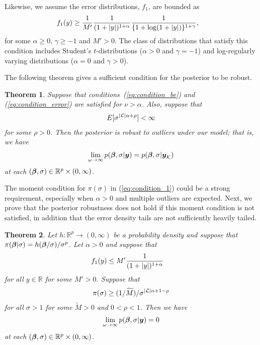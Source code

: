 \documentclass[12pt]{article}
\newtheorem{thm}{Theorem}
\def\si{{\sigma}}
\def\al{{\alpha}}
\def\ga{{\gamma}}
\def\si{{\sigma}}
\def\om{{\omega}}
\def\non{{\nonumber}}
\def\Lc{{\cal L}}
\def\Kc{{\cal K}}
\def\Mt{{\widetilde M}}
\def\al{{\alpha}}
\def\ga{{\gamma}}
\def\si{{\sigma}}
\def\om{{\omega}}
\def\bbe{{\text{\boldmath $\beta$}}}
\def\y{{\text{\boldmath $y$}}}
\def\Lc{{\cal L}}
\def\Kc{{\cal K}}
\def\non{{\nonumber}}
\begin{document}
Likewise, we assume the error distributions, $f_1$, are bounded as 
\begin{align}
f_1 (y) &\ge {1 \over M'} {1 \over (1 + |y|)^{1 + \al }} {1 \over \{ 1 + \log (1 + |y|) \} ^{1 + \ga }} ,\label{eq:condition_error} 
\end{align}
%
for some $\al \ge 0$, $\ga \ge - 1$ and $M' > 0$. 
The class of distributions that satisfy this condition includes Student's $t$-distributions ($\al > 0$ and $\ga = - 1$) and  log-regularly varying distributions ($\al = 0$ and $\ga > 0$). 

The following theorem gives a sufficient condition for the posterior to be robust. 

\begin{thm}
\label{thm:condition} 
Suppose that conditions~(\ref{eq:condition_be}) and (\ref{eq:condition_error}) are satisfied for $\nu > \al $. 
Also, suppose that 
\begin{align}
E[ \si ^{| \Lc | \al + \rho } ] < \infty \label{eq:condition_1} 
\end{align}
for some $\rho > 0$. 
Then the posterior is robust to outliers under our model; that is, we have 
\begin{align}
\lim_{\om \to \infty } p( \bbe , \si | \y ) = p( \bbe , \si | \y _{\Kc } ) \non 
\end{align}
at each $( \bbe , \si ) \in \mathbb{R} ^p \times (0, \infty )$. 
\end{thm}


%
The moment condition for $\pi(\si)$ in (\ref{eq:condition_1}) could be a strong requirement, especially when $\alpha>0$ and multiple outliers are expected. Next, we prove that the posterior robustness does not hold if this moment condition is not satisfied, in addition that the error density tails are not sufficiently heavily tailed. 

\begin{thm}
\label{thm:necessary} 
%
Let $h \colon \mathbb{R} ^p \to (0, \infty )$ be a probability density and suppose that $\pi ( \bbe | \si ) = h( \bbe / \si ) / \si ^p$. %
Let $\al > 0$ and suppose that 
\begin{align}
f_1 (y) &\le M' {1 \over (1 + |y|)^{1 + \al }} \non 
\end{align}
for all $y \in \mathbb{R}$ for some $M' > 0$. 
Suppose that 
\begin{align}
\pi ( \si ) \ge (1 / \Mt ) / \si ^{| \Lc | \al + 1 - \rho } \label{eq:condition_2} 
\end{align}
for all $\si > 1$ for some $\Mt > 0$ and $0 < \rho < 1$. 
Then we have 
\begin{align}
\lim_{\om \to \infty } p( \bbe , \si | \y ) = 0 \non 
\end{align}
at each $( \bbe , \si ) \in \mathbb{R} ^p \times (0, \infty )$. 
\end{thm}
\end{document}
